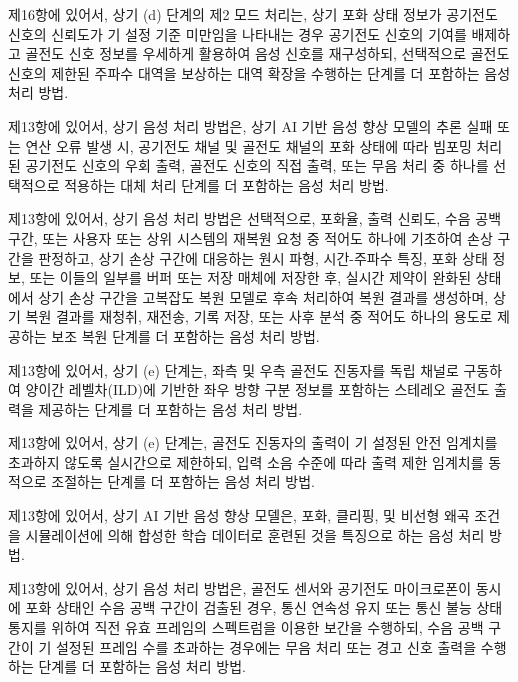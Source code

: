 \documentclass{article}
\DeclareRobustCommand{\codexedit}[1]{\textcolor{customorange}{#1}}
\DeclareRobustCommand{\vtwoedit}[1]{\textcolor{customgreen}{#1}}
\begin{document}
\begin{enumerate}[label=\textbf{[\arabic*]}]
    \item \codexedit{제16항에 있어서,
    \vtwoedit{상기 (d) 단계의 제2 모드 처리는, 상기 포화 상태 정보가 공기전도 신호의 신뢰도가 기 설정 기준 미만임을 나타내는 경우 공기전도 신호의 기여를 배제하고 골전도 신호 정보를 우세하게 활용하여 음성 신호를 재구성하되, 선택적으로 골전도 신호의 제한된 주파수 대역을 보상하는 대역 확장을 수행하는 단계를 더 포함하는 음성 처리 방법.}}

    \item \codexedit{제13항에 있어서,
    상기 음성 처리 방법은, 상기 AI 기반 음성 향상 모델의 추론 실패 또는 연산 오류 발생 시, 공기전도 채널 및 골전도 채널의 포화 상태에 따라 빔포밍 처리된 공기전도 신호의 우회 출력, 골전도 신호의 직접 출력, 또는 무음 처리 중 하나를 선택적으로 적용하는 대체 처리 단계를 더 포함하는 음성 처리 방법.}

    \item \codexedit{제13항에 있어서,
    상기 음성 처리 방법은 선택적으로,
    포화율, 출력 신뢰도, 수음 공백 구간, 또는 사용자 또는 상위 시스템의 재복원 요청 중 적어도 하나에 기초하여 손상 구간을 판정하고,
    상기 손상 구간에 대응하는 원시 파형, 시간-주파수 특징, \vtwoedit{포화 상태 정보}, 또는 이들의 일부를 버퍼 또는 저장 매체에 저장한 후,
    \vtwoedit{실시간 제약이 완화된 상태에서} 상기 손상 구간을 고복잡도 복원 모델로 후속 처리하여 복원 결과를 생성하며,
    상기 복원 결과를 재청취, 재전송, 기록 저장, 또는 사후 분석 중 적어도 하나의 용도로 제공하는 보조 복원 단계를 더 포함하는 음성 처리 방법.}

    \item \codexedit{제13항에 있어서,
    상기 (e) 단계는, 좌측 및 우측 골전도 진동자를 독립 채널로 구동하여 양이간 레벨차(ILD)에 기반한 좌우 방향 구분 정보를 포함하는 스테레오 골전도 출력을 제공하는 단계를 더 포함하는 음성 처리 방법.}

    \item \codexedit{제13항에 있어서,
    상기 (e) 단계는, 골전도 진동자의 출력이 기 설정된 안전 임계치를 초과하지 않도록 실시간으로 제한하되, 입력 소음 수준에 따라 출력 제한 임계치를 동적으로 조절하는 단계를 더 포함하는 음성 처리 방법.}

    \item \codexedit{제13항에 있어서,
    상기 AI 기반 음성 향상 모델은, 포화, 클리핑, 및 비선형 왜곡 조건을 시뮬레이션에 의해 합성한 학습 데이터로 훈련된 것을 특징으로 하는 음성 처리 방법.}

    \item \codexedit{제13항에 있어서,
    상기 음성 처리 방법은, 골전도 센서와 공기전도 마이크로폰이 동시에 포화 상태인 수음 공백 구간이 검출된 경우, 통신 연속성 유지 또는 통신 불능 상태 통지를 위하여 직전 유효 프레임의 스펙트럼을 이용한 보간을 수행하되, 수음 공백 구간이 기 설정된 프레임 수를 초과하는 경우에는 무음 처리 또는 경고 신호 출력을 수행하는 단계를 더 포함하는 음성 처리 방법.}


\end{enumerate}
\end{document}
